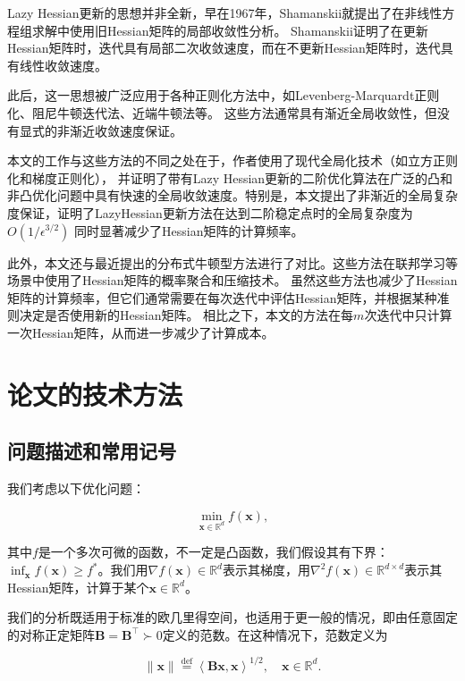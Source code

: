 \documentclass[a4paper,twoside,AutoFakeBold]{article}
\theoremstyle{definition}
\begin{document}
Lazy Hessian更新的思想并非全新，早在1967年，Shamanskii就提出了在非线性方程组求解中使用旧Hessian矩阵的局部收敛性分析。
Shamanskii证明了在更新Hessian矩阵时，迭代具有局部二次收敛速度，而在不更新Hessian矩阵时，迭代具有线性收敛速度。

此后，这一思想被广泛应用于各种正则化方法中，如Levenberg-Marquardt正则化、阻尼牛顿迭代法、近端牛顿法等。
这些方法通常具有渐近全局收敛性，但没有显式的非渐近收敛速度保证。

本文的工作与这些方法的不同之处在于，作者使用了现代全局化技术（如立方正则化和梯度正则化），
并证明了带有Lazy Hessian更新的二阶优化算法在广泛的凸和非凸优化问题中具有快速的全局收敛速度。特别是，本文提出了非渐近的全局复杂度保证，证明了LazyHessian更新方法在达到二阶稳定点时的全局复杂度为
$O(1/\epsilon^{3/2})$
同时显著减少了Hessian矩阵的计算频率。

此外，本文还与最近提出的分布式牛顿型方法进行了对比。这些方法在联邦学习等场景中使用了Hessian矩阵的概率聚合和压缩技术。
虽然这些方法也减少了Hessian矩阵的计算频率，但它们通常需要在每次迭代中评估Hessian矩阵，并根据某种准则决定是否使用新的Hessian矩阵。
相比之下，本文的方法在每$m$次迭代中只计算一次Hessian矩阵，从而进一步减少了计算成本。
\newpage

\section{论文的技术方法}


\subsection{问题描述和常用记号}

我们考虑以下优化问题：

\begin{equation}\label{1}
\min_{\mathbf{x} \in \mathbb{R}^d} f(\mathbf{x}), \tag{1}
\end{equation}

其中\(f\)是一个多次可微的函数，不一定是凸函数，我们假设其有下界：\(\inf_{\mathbf{x}} f(\mathbf{x}) \geq f^*\)。我们用\(\nabla f(\mathbf{x}) \in \mathbb{R}^d\)表示其梯度，用\(\nabla^2 f(\mathbf{x}) \in \mathbb{R}^{d \times d}\)表示其Hessian矩阵，计算于某个\(\mathbf{x} \in \mathbb{R}^d\)。

我们的分析既适用于标准的欧几里得空间，也适用于更一般的情况，即由任意固定的对称正定矩阵\(\mathbf{B} = \mathbf{B}^\top \succ 0\)定义的范数。在这种情况下，范数定义为

\begin{equation}\label{2}
\|\mathbf{x}\| \stackrel{\text{def}}{=} \left\langle \mathbf{B} \mathbf{x}, \mathbf{x} \right\rangle^{1/2}, \quad \mathbf{x} \in \mathbb{R}^d. \tag{2}
\end{equation}
\end{document}
